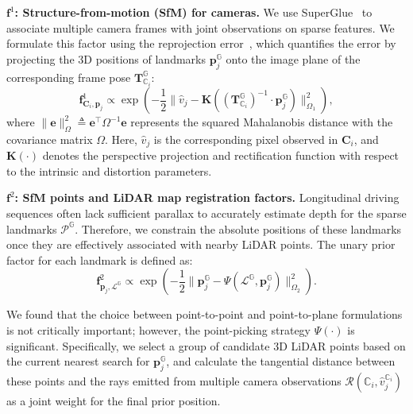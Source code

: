 \textbf{$\mathbf{f}^1$: Structure-from-motion (SfM) for cameras.} We use SuperGlue~\cite{wang2019superglue} to associate multiple camera frames with joint observations on sparse features.
We formulate this factor using the reprojection error~\cite{scho2016sfm}, which quantifies the error by projecting the 3D positions of landmarks $\mathbf{p}_j^\mathbb{G}$ onto the image plane of the corresponding frame pose $\mathbf{T}_{\mathbb{C}_i}^\mathbb{G}$:
%
\begin{equation}
  \mathbf{f}_{\mathbf{C}_i, \mathbf{p}_j}^{1} \propto \exp(-\frac{1}{2} \|
  \hat{v}_j - \mathbf{K} ( (\mathbf{T}_{\mathbb{C}_i}^\mathbb{G})^{-1} \cdot \mathbf{p}_j^\mathbb{G} ) 
\|_{\Omega_{1}}^2),
\label{equ:sfm1}
\end{equation}
%
where $\| \mathbf{e} \|_\Omega^2 \triangleq \mathbf{e}^\top \Omega^{-1} \mathbf{e}$ represents the squared Mahalanobis distance with the covariance matrix $\Omega$. Here, $\hat{v}_j$ is the corresponding pixel observed in $\mathbf{C}_i$, and $\mathbf{K}(\cdot)$ denotes the perspective projection and rectification function with respect to the intrinsic and distortion parameters.

\textbf{$\mathbf{f}^2$: SfM points and LiDAR map registration factors.} 
Longitudinal driving sequences often lack sufficient parallax to accurately estimate depth for the sparse landmarks $\mathcal{P}^\mathbb{G}$. Therefore, we constrain the absolute positions of these landmarks once they are effectively associated with nearby LiDAR points. The unary prior factor for each landmark is defined as:
%
\begin{equation}
  \mathbf{f}_{\mathbf{p}_j, \mathcal{L}^\mathbb{G}}^{2} \propto \exp(-\frac{1}{2} \|
  \mathbf{p}_j^\mathbb{G} - \Psi(\mathcal{L}^\mathbb{G}, \mathbf{p}_j^\mathbb{G})
\|_{\Omega_{2}}^2).
\label{equ:sfm2}
\end{equation}
%

We found that the choice between point-to-point and point-to-plane formulations is not critically important; however, the point-picking strategy $\Psi(\cdot)$ is significant. Specifically, we select a group of candidate 3D LiDAR points based on the current nearest search for $\mathbf{p}_j^\mathbb{G}$, and calculate the tangential distance between these points and the rays emitted from multiple camera observations $\mathcal{R}(\mathbb{C}_i, \hat{v}_j^{\mathbb{C}_i})$ as a joint weight for the final prior position.


